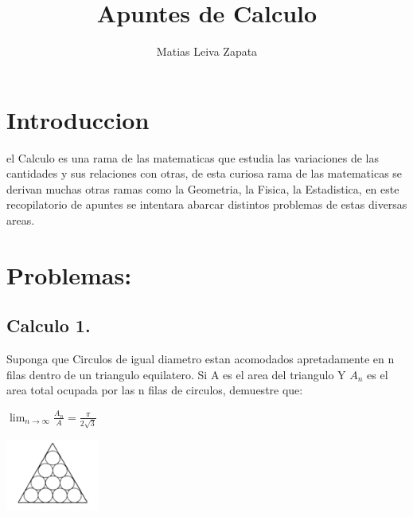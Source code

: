 \documentclass{article}
\title{\textbf{Apuntes de Calculo}}
\author{Matias Leiva Zapata}
\theoremstyle{mytheoremstyle}
\theoremstyle{mytheoremstyle}
\theoremstyle{myproblemstyle}
\begin{document}
\maketitle

\section{Introduccion}
el Calculo es una rama de las matematicas que estudia las variaciones de las cantidades y sus relaciones con otras,
de esta curiosa rama de las matematicas se derivan muchas otras ramas como la Geometria, la Fisica, la Estadistica,
en este recopilatorio de apuntes se intentara abarcar distintos problemas de estas diversas areas.

\section{Problemas:}

\subsection{Calculo 1.}
\smallskip
\begin{problem}

Suponga que Circulos de igual diametro estan acomodados apretadamente en n filas dentro de un triangulo equilatero.
Si A es el area del triangulo Y $A_n$ es el area total ocupada por las n filas de circulos, demuestre que:

\begin{center}

    $ \displaystyle\lim_{n \to \infty}   \frac{A_n}{A} = \frac{\pi}{2\sqrt{3}}$

    \includegraphics[width=0.23\textwidth,height = 0.2\textwidth]{Triangulo_problema2.2.png}

\end{center}

\end{problem}
\end{document}
